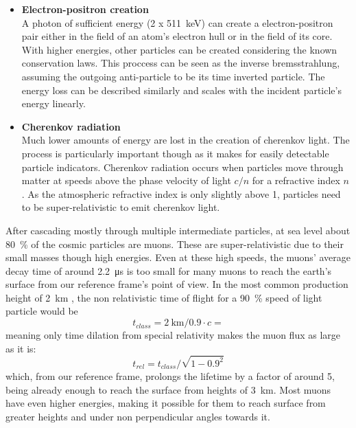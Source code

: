 \begin{itemize}
\begin{itemize}
		\item{\bf Electron-positron creation}\\
		A photon of sufficient energy (2 x \SI{511}{\kilo\electronvolt}) can create a electron-positron pair either in the field of an atom's electron hull or in the field of its core. With higher energies, other particles can be created considering the known conservation laws. 
		This proccess can be seen as the inverse bremsstrahlung, assuming the outgoing anti-particle to be its time inverted particle. The energy loss can be described similarly and scales with the incident particle's energy linearly.

		\item{\bf Cherenkov radiation}\\
		Much lower amounts of energy are lost in the creation of cherenkov light. The process is particularly important though as it makes for easily detectable particle indicators. Cherenkov radiation occurs when particles move through matter at speeds above the phase velocity of light $c/n$ for a refractive index $n$. As the atmospheric refractive index is only slightly above 1, particles need to be super-relativistic to emit cherenkov light. 		
    \end{itemize}
    \end{itemize}
	After cascading mostly through multiple intermediate particles, at sea level about \SI{80}{\percent} of the cosmic particles are muons. These are super-relativistic due to their small masses though high energies. Even at these high speeds, the muons' average decay time of around \SI{2.2}{\micro\second} \cite{muonLifetime} is too small for many muons to reach the earth's surface from our reference frame's point of view. In the most common production height of \SI{2}{\kilo\meter} \cite{muonProductionHeight}, the non relativistic time of flight for a \SI{90}{\percent} speed of light particle would be
    \begin{equation}
	t_{class} = \SI{2}{\kilo\meter} / 0.9\cdot c = 
    \end{equation}
    meaning only time dilation from special relativity makes the muon flux as large as it is:
    \begin{equation}
    	t_{rel} = t_{class} / \sqrt{1-0.9^2}
    \end{equation}
    which, from our reference frame, prolongs the lifetime by a factor of around 5, being already enough to reach the surface from heights of \SI{3}{\kilo\meter}. Most muons have even higher energies, making it possible for them to reach surface from greater heights and under non perpendicular angles towards it.
